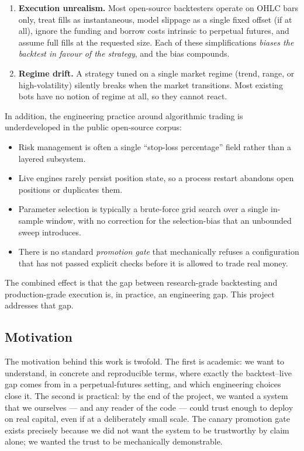 \documentclass[a4paper, 12pt, titlepage]{article}
\begin{document}
\begin{enumerate}[label=(P\arabic*),leftmargin=2.2em]
    \item \textbf{Execution unrealism.} Most open-source backtesters
    operate on OHLC bars only, treat fills as instantaneous, model
    slippage as a single fixed offset (if at all), ignore the funding
    and borrow costs intrinsic to perpetual futures, and assume full
    fills at the requested size. Each of these simplifications
    \emph{biases the backtest in favour of the strategy}, and the
    bias compounds.
    \item \textbf{Regime drift.} A strategy tuned on a single market
    regime (trend, range, or high-volatility) silently breaks when
    the market transitions. Most existing bots have no notion of
    regime at all, so they cannot react.
\end{enumerate}

In addition, the engineering practice around algorithmic trading is
underdeveloped in the public open-source corpus:

\begin{itemize}[noitemsep]
    \item Risk management is often a single ``stop-loss percentage''
    field rather than a layered subsystem.
    \item Live engines rarely persist position state, so a process
    restart abandons open positions or duplicates them.
    \item Parameter selection is typically a brute-force grid search
    over a single in-sample window, with no correction for the
    selection-bias that an unbounded sweep introduces.
    \item There is no standard \emph{promotion gate} that
    mechanically refuses a configuration that has not passed
    explicit checks before it is allowed to trade real money.
\end{itemize}

The combined effect is that the gap between research-grade
backtesting and production-grade execution is, in practice, an
engineering gap. This project addresses that gap.

\subsection{Motivation}

The motivation behind this work is twofold. The first is academic:
we want to understand, in concrete and reproducible terms, where
exactly the backtest--live gap comes from in a perpetual-futures
setting, and which engineering choices close it. The second is
practical: by the end of the project, we wanted a system that we
ourselves --- and any reader of the code --- could trust enough to
deploy on real capital, even if at a deliberately small scale. The
canary promotion gate exists precisely because we did not want the
system to be trustworthy by claim alone; we wanted the trust to be
mechanically demonstrable.
\end{document}
